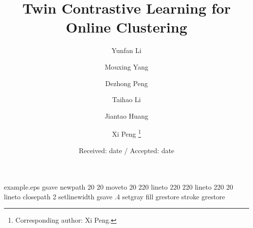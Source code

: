 \begin{filecontents*}{example.eps}
gsave
newpath
  20 20 moveto
  20 220 lineto
  220 220 lineto
  220 20 lineto
closepath
2 setlinewidth
gsave
  .4 setgray fill
grestore
stroke
grestore
\end{filecontents*}
\RequirePackage{fix-cm}
\documentclass[twocolumn]{svjour3}          \smartqed  \usepackage{graphicx}
\usepackage{amsmath,amssymb} \usepackage{color}
\usepackage{dsfont}
\usepackage[algo2e]{algorithm2e}
\usepackage{algorithmic}
\usepackage{algorithm}
\usepackage{subfigure}
\usepackage{booktabs}
\usepackage{multirow}
\usepackage[pagebackref=true,breaklinks=true,letterpaper=true,colorlinks,bookmarks=false,citecolor=blue]{hyperref}
\usepackage{cite}
\usepackage{natbib}
\usepackage{bbm}

\def \rf{\textcolor{blue}}



\title{Twin Contrastive Learning for Online Clustering}



\author{Yunfan Li \and
        Mouxing Yang \and
        Dezhong Peng \and
        Taihao Li \and
        Jiantao Huang \and
        Xi Peng
\thanks{Corresponding author: Xi Peng.}
}






\date{Received: date / Accepted: date}



\maketitle

